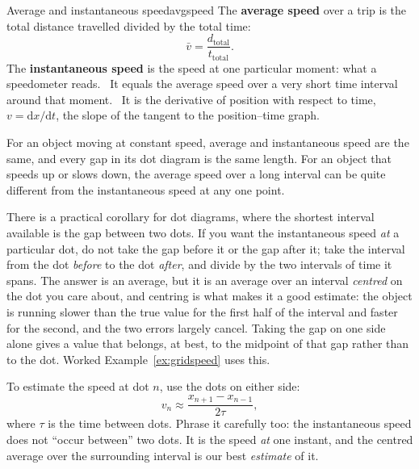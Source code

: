 \documentclass[11pt,twoside,openany]{book}
\newcommand{\dd}{\mathrm{d}}
\newcommand{\viewtag}[3]{\fcolorbox{#2}{#3}{\footnotesize\textbf{\textcolor{#2}{#1}}}}
\newcommand{\elemtag}{\viewtag{Elementary}{elemcol}{elempale}}
\newcommand{\calctag}{\viewtag{Calculus}{calccol}{calcpale}}
\begin{document}
\begin{definition}{Average and instantaneous speed}{avgspeed}
The \textbf{average speed} over a trip is the total distance travelled divided by the total time:
\[
\bar v = \frac{d_{\text{total}}}{t_{\text{total}}}.
\]
The \textbf{instantaneous speed} is the speed at one particular moment: what a speedometer reads. \elemtag\ It equals the average speed over a very short time interval around that moment. \calctag\ It is the derivative of position with respect to time, $v = \dd x/\dd t$, the slope of the tangent to the position--time graph.
\end{definition}

For an object moving at constant speed, average and instantaneous speed are the same, and every gap in its dot diagram is the same length. For an object that speeds up or slows down, the average speed over a long interval can be quite different from the instantaneous speed at any one point.

There is a practical corollary for dot diagrams, where the shortest interval available is the gap between two dots. If you want the instantaneous speed \emph{at} a particular dot, do not take the gap before it or the gap after it; take the interval from the dot \emph{before} to the dot \emph{after}, and divide by the two intervals of time it spans. The answer is an average, but it is an average over an interval \emph{centred} on the dot you care about, and centring is what makes it a good estimate: the object is running slower than the true value for the first half of the interval and faster for the second, and the two errors largely cancel. Taking the gap on one side alone gives a value that belongs, at best, to the midpoint of that gap rather than to the dot. Worked Example~\ref{ex:gridspeed} uses this.

\begin{keyidea}
To estimate the speed at dot $n$, use the dots on either side:
\[
v_n \approx \frac{x_{n+1} - x_{n-1}}{2\tau},
\]
where $\tau$ is the time between dots. Phrase it carefully too: the instantaneous speed does not ``occur between'' two dots. It is the speed \emph{at} one instant, and the centred average over the surrounding interval is our best \emph{estimate} of it.
\end{keyidea}
\end{document}
